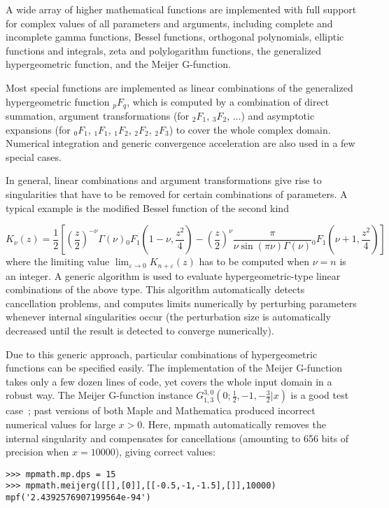 A wide array of higher mathematical functions are implemented
with full support for complex values of all parameters and arguments,
including complete and incomplete gamma functions,
Bessel functions, orthogonal polynomials, elliptic functions and integrals,
zeta and polylogarithm functions,
the generalized hypergeometric function, and the Meijer G-function.

Most special functions are implemented as linear
combinations of the generalized hypergeometric function ${}_{p}F_{q}$,
which is computed by a combination of direct summation,
argument transformations (for ${}_2F_1$, ${}_3F_2$, $\ldots$)
and asymptotic expansions
(for ${}_0F_1$, ${}_1F_1$, ${}_1F_2$, ${}_2F_2$, ${}_2F_3$)
to cover the whole complex domain.
Numerical integration and generic convergence acceleration
are also used in a few special cases.

In general, linear combinations and argument transformations
give rise to singularities that have to be removed for certain
combinations of parameters.
A typical example is the modified Bessel function of the second kind

$$K_{\nu}(z) = \frac{1}{2} \left[
            {\left(\frac{z}{2}\right)}^{-\nu}
                \Gamma(\nu)
                {}_0F_1\!\left(1-\nu, \frac{z^2}{4}\right)
             -
             {\left(\frac{z}{2}\right)}^{\nu}
                 \frac{\pi}{\nu \sin(\pi \nu) \Gamma(\nu)}
                 {}_0F_1\!\left(\nu+1, \frac{z^2}{4}\right)
            \right]$$
where the limiting value $\lim_{\varepsilon \to 0} K_{n+\varepsilon}(z)$
has to be computed when $\nu = n$ is an integer.
A generic algorithm is used to evaluate
hypergeometric-type linear combinations of the above type.
This algorithm automatically detects cancellation problems,
and computes limits numerically by perturbing parameters whenever
internal singularities occur (the perturbation size is automatically
decreased until the result is detected to converge numerically).

Due to this generic approach, particular combinations of hypergeometric
functions can be specified easily.
The implementation of the Meijer G-function takes only a few dozen lines of
code, yet covers the whole input domain in a robust way.
The Meijer G-function instance
$G_{1, 3}^{3, 0}\left(0 ; \tfrac{1}{2}, -1, - \tfrac{3}{2} | x \right)$
is a good test case~\cite{Toth2007}; past versions of both Maple and
Mathematica produced incorrect numerical values for large $x > 0$.
Here, mpmath automatically removes the internal singularity
and compensates for cancellations (amounting to 656 bits
of precision when $x = 10000$), giving correct values:
\begin{verbatim}
>>> mpmath.mp.dps = 15
>>> mpmath.meijerg([[],[0]],[[-0.5,-1,-1.5],[]],10000)
mpf('2.4392576907199564e-94')
\end{verbatim}

